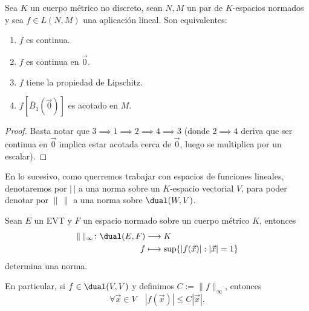 \documentclass[topologia-analisis.tex]{subfiles}
\begin{document}
\begin{prop}
	Sea $K$ un cuerpo métrico no discreto, sean $N, M$ un par de $K$-espacios normados y sea $f \in L(N, M)$ una aplicación lineal.
	Son equivalentes:
	\begin{enumerate}
		\item $f$ es continua.
		\item $f$ es continua en $\Vec 0$.
		\item $f$ tiene la propiedad de Lipschitz.
		\item $f[\overline{B}_1(\Vec 0)]$ es acotado en $M$.
	\end{enumerate}
\end{prop}
\begin{proof}
	Basta notar que $3 \implies 1 \implies 2 \implies 4 \implies 3$
	(donde $2\implies 4$ deriva que ser continua en $\Vec 0$ implica estar acotada cerca de $\vec 0$, luego se multiplica por un escalar).
\end{proof}

En lo sucesivo, como querremos trabajar con espacios de funciones lineales, denotaremos por $|\,|$ a una norma sobre un $K$-espacio vectorial $V$,
para poder denotar por $\|\,\|$ a una norma sobre $\dual(W, V)$.
\begin{prop}
	Sean $E$ un EVT y $F$ un espacio normado sobre un cuerpo métrico $K$, entonces
	\begin{align*}
		\| \, \|_\infty \colon \dual(E, F) &\longrightarrow K \\
		f &\longmapsto \sup\{|f(\vec x)| : |\vec x| = 1 \}
	\end{align*}
	determina una norma.
\end{prop}
En particular, si $f \in \dual(V, V)$ y definimos $C := \|f\|_\infty$, entonces
$$ \forall\vec x\in V \quad | f(\vec x) | \le C |\vec x|. $$

\end{document}
